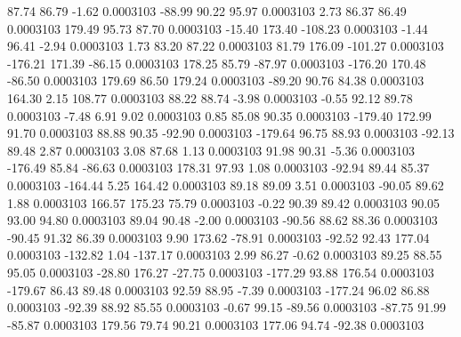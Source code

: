        87.74       86.79       -1.62     0.0003103
      -88.99       90.22       95.97     0.0003103
        2.73       86.37       86.49     0.0003103
      179.49       95.73       87.70     0.0003103
      -15.40      173.40     -108.23     0.0003103
       -1.44       96.41       -2.94     0.0003103
        1.73       83.20       87.22     0.0003103
       81.79      176.09     -101.27     0.0003103
     -176.21      171.39      -86.15     0.0003103
      178.25       85.79      -87.97     0.0003103
     -176.20      170.48      -86.50     0.0003103
      179.69       86.50      179.24     0.0003103
      -89.20       90.76       84.38     0.0003103
      164.30        2.15      108.77     0.0003103
       88.22       88.74       -3.98     0.0003103
       -0.55       92.12       89.78     0.0003103
       -7.48        6.91        9.02     0.0003103
        0.85       85.08       90.35     0.0003103
     -179.40      172.99       91.70     0.0003103
       88.88       90.35      -92.90     0.0003103
     -179.64       96.75       88.93     0.0003103
      -92.13       89.48        2.87     0.0003103
        3.08       87.68        1.13     0.0003103
       91.98       90.31       -5.36     0.0003103
     -176.49       85.84      -86.63     0.0003103
      178.31       97.93        1.08     0.0003103
      -92.94       89.44       85.37     0.0003103
     -164.44        5.25      164.42     0.0003103
       89.18       89.09        3.51     0.0003103
      -90.05       89.62        1.88     0.0003103
      166.57      175.23       75.79     0.0003103
       -0.22       90.39       89.42     0.0003103
       90.05       93.00       94.80     0.0003103
       89.04       90.48       -2.00     0.0003103
      -90.56       88.62       88.36     0.0003103
      -90.45       91.32       86.39     0.0003103
        9.90      173.62      -78.91     0.0003103
      -92.52       92.43      177.04     0.0003103
     -132.82        1.04     -137.17     0.0003103
        2.99       86.27       -0.62     0.0003103
       89.25       88.55       95.05     0.0003103
      -28.80      176.27      -27.75     0.0003103
     -177.29       93.88      176.54     0.0003103
     -179.67       86.43       89.48     0.0003103
       92.59       88.95       -7.39     0.0003103
     -177.24       96.02       86.88     0.0003103
      -92.39       88.92       85.55     0.0003103
       -0.67       99.15      -89.56     0.0003103
      -87.75       91.99      -85.87     0.0003103
      179.56       79.74       90.21     0.0003103
      177.06       94.74      -92.38     0.0003103
